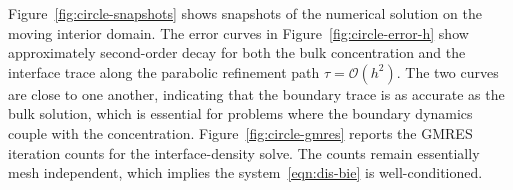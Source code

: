 \documentclass[11pt,reqno]{amsart}
\theoremstyle{plain}
\theoremstyle{definition}
\numberwithin{equation}{section}
\newcommand{\mc}[1]{\mathcal{#1}}
\begin{document}



Figure~\ref{fig:circle-snapshots} shows snapshots of the numerical solution on
the moving interior domain. The error curves in Figure~\ref{fig:circle-error-h} show
approximately second-order decay for both the bulk concentration and the
interface trace along the parabolic refinement path $\tau=\mc O(h^2)$. The two
curves are close to one another, indicating that the boundary trace is as accurate as the bulk solution, which is essential for problems where the boundary dynamics couple with the concentration.
Figure~\ref{fig:circle-gmres} reports the GMRES iteration counts for the
interface-density solve. The counts remain essentially mesh independent, which implies the system~\eqref{eqn:dis-bie} is well-conditioned.
\end{document}
